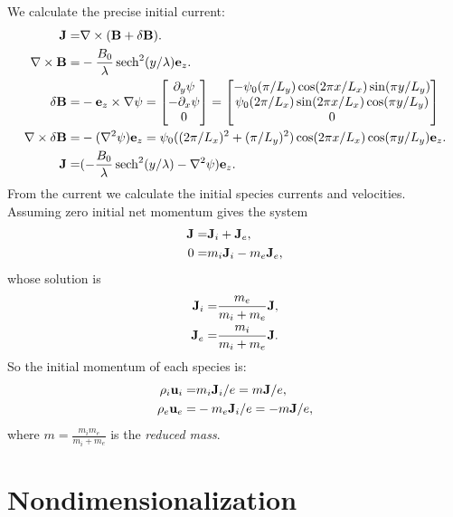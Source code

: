 \documentclass[12pt,fleqn]{article}
\numberwithin{equation}{section}
\begin{document}
We calculate the precise initial current:
\begin{align*}
     \mathbf{J} =& \nabla\times (\mathbf{B} + \delta\mathbf{B}).
\\ \nabla\times\mathbf{B} =& -\frac{B_0}{\lambda}\,\mathrm{sech}^2(y/\lambda) \mathbf{e}_z.
\\ \delta\mathbf{B}=&-\mathbf{e}_z\times\nabla \psi
   =  \begin{bmatrix}
        \partial_y \psi \\
       -\partial_x \psi \\
        0
      \end{bmatrix}
   =  \begin{bmatrix}
        -\psi_0(\pi/L_y) \cos(2\pi x/L_x) \sin(\pi y/L_y)  \\
         \psi_0(2\pi/L_x) \sin(2\pi x/L_x) \cos(\pi y/L_y) \\
        0
      \end{bmatrix}
\\ \nabla\times\delta\mathbf{B} =& -(\nabla^2\psi)\mathbf{e}_z
       =  \psi_0 ((2\pi/L_x)^2+(\pi/L_y)^2) \cos(2\pi x/L_x) \cos(\pi y/L_y)\mathbf{e}_z.
\\ \mathbf{J} =& (-\frac{B_0}{\lambda}\,\mathrm{sech}^2(y/\lambda) - \nabla^2 \psi) \mathbf{e}_z.
\end{align*}
From the current we calculate the initial species currents and
velocities.  Assuming zero initial net momentum gives the system
\begin{align*}
  \mathbf{J} =& \mathbf{J}_i + \mathbf{J}_e, \\
   0 =& m_i\mathbf{J}_i - m_e\mathbf{J}_e,
\end{align*}
whose solution is
\begin{align*}
  \mathbf{J}_i =& \frac{m_e}{m_i+m_e} \mathbf{J}, \\
  \mathbf{J}_e =& \frac{m_i}{m_i+m_e} \mathbf{J}.
\end{align*}
So the initial momentum of each species is:
\begin{align*}
  \rho_i\mathbf{u}_i =& m_i \mathbf{J}_i/e = m \mathbf{J}/e, \\
  \rho_e\mathbf{u}_e =& -m_e \mathbf{J}_i/e = -m \mathbf{J}/e,
\end{align*}
where
$m = \frac{m_i m_e}{m_i+m_e}$ is the \emph{reduced mass}.

\appendix

\section{Nondimensionalization}
\end{document}
